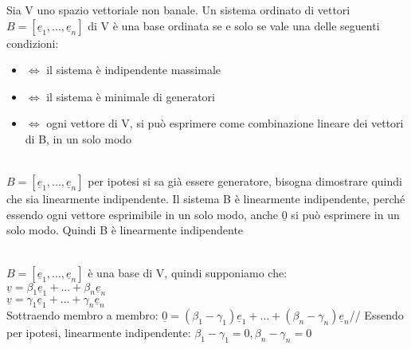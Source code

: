 \begin{teorema}
	Sia V uno spazio vettoriale non banale. Un sistema ordinato di vettori $B=[\underline{e}_1,...,\underline{e}_n]$ di V è una base ordinata se e solo se vale una delle seguenti condizioni:
	\begin{itemize}
		\item $\Longleftrightarrow$ il sistema è indipendente massimale
		\item $\Longleftrightarrow$ il sistema è minimale di generatori
		\item $\Longleftrightarrow$ ogni vettore di V, si può esprimere come combinazione lineare dei vettori di B, in un solo modo
	\end{itemize}
	\begin{dimostrazione}
		\phantom{}\\
		$B=[\underline{e}_1,...,\underline{e}_n]$ per ipotesi si sa già essere generatore, bisogna dimostrare quindi che sia linearmente indipendente. Il sistema B è linearmente indipendente, perché essendo ogni vettore esprimibile in un solo modo, anche $\underline{0}$ si può esprimere in un solo modo. Quindi B è linearmente indipendente
	\end{dimostrazione}
	\begin{dimostrazione}
		\phantom{}\\
		$B=[\underline{e}_1,...,\underline{e}_n]$ è una base di V, quindi supponiamo che:\\
		$\underline{v}=\beta_1 \underline{e}_1+...+\beta_n \underline{e}_n$\\
		$\underline{v}=\gamma_1 \underline{e}_1+...+\gamma_n \underline{e}_n$\\
		Sottraendo membro a membro: $\underline{0}=(\beta_1-\gamma_1)\underline{e}_1+...+(\beta_n-\gamma_n)\underline{e}_n$//
		Essendo per ipotesi, linearmente indipendente: $\beta_1-\gamma_1=0, \beta_n-\gamma_n=0$
	\end{dimostrazione}
\end{teorema}

